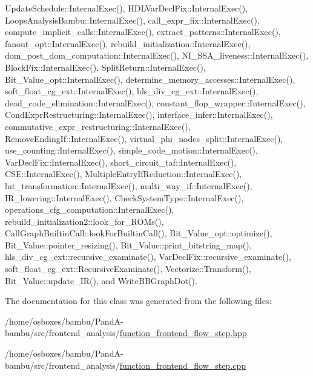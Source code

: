 Update\+Schedule\+::\+Internal\+Exec(), H\+D\+L\+Var\+Decl\+Fix\+::\+Internal\+Exec(), Loops\+Analysis\+Bambu\+::\+Internal\+Exec(), call\+\_\+expr\+\_\+fix\+::\+Internal\+Exec(), compute\+\_\+implicit\+\_\+calls\+::\+Internal\+Exec(), extract\+\_\+patterns\+::\+Internal\+Exec(), fanout\+\_\+opt\+::\+Internal\+Exec(), rebuild\+\_\+initialization\+::\+Internal\+Exec(), dom\+\_\+post\+\_\+dom\+\_\+computation\+::\+Internal\+Exec(), N\+I\+\_\+\+S\+S\+A\+\_\+liveness\+::\+Internal\+Exec(), Block\+Fix\+::\+Internal\+Exec(), Split\+Return\+::\+Internal\+Exec(), Bit\+\_\+\+Value\+\_\+opt\+::\+Internal\+Exec(), determine\+\_\+memory\+\_\+accesses\+::\+Internal\+Exec(), soft\+\_\+float\+\_\+cg\+\_\+ext\+::\+Internal\+Exec(), hls\+\_\+div\+\_\+cg\+\_\+ext\+::\+Internal\+Exec(), dead\+\_\+code\+\_\+elimination\+::\+Internal\+Exec(), constant\+\_\+flop\+\_\+wrapper\+::\+Internal\+Exec(), Cond\+Expr\+Restructuring\+::\+Internal\+Exec(), interface\+\_\+infer\+::\+Internal\+Exec(), commutative\+\_\+expr\+\_\+restructuring\+::\+Internal\+Exec(), Remove\+Ending\+If\+::\+Internal\+Exec(), virtual\+\_\+phi\+\_\+nodes\+\_\+split\+::\+Internal\+Exec(), use\+\_\+counting\+::\+Internal\+Exec(), simple\+\_\+code\+\_\+motion\+::\+Internal\+Exec(), Var\+Decl\+Fix\+::\+Internal\+Exec(), short\+\_\+circuit\+\_\+taf\+::\+Internal\+Exec(), C\+S\+E\+::\+Internal\+Exec(), Multiple\+Entry\+If\+Reduction\+::\+Internal\+Exec(), lut\+\_\+transformation\+::\+Internal\+Exec(), multi\+\_\+way\+\_\+if\+::\+Internal\+Exec(), I\+R\+\_\+lowering\+::\+Internal\+Exec(), Check\+System\+Type\+::\+Internal\+Exec(), operations\+\_\+cfg\+\_\+computation\+::\+Internal\+Exec(), rebuild\+\_\+initialization2\+::look\+\_\+for\+\_\+\+R\+O\+Ms(), Call\+Graph\+Builtin\+Call\+::look\+For\+Builtin\+Call(), Bit\+\_\+\+Value\+\_\+opt\+::optimize(), Bit\+\_\+\+Value\+::pointer\+\_\+resizing(), Bit\+\_\+\+Value\+::print\+\_\+bitstring\+\_\+map(), hls\+\_\+div\+\_\+cg\+\_\+ext\+::recursive\+\_\+examinate(), Var\+Decl\+Fix\+::recursive\+\_\+examinate(), soft\+\_\+float\+\_\+cg\+\_\+ext\+::\+Recursive\+Examinate(), Vectorize\+::\+Transform(), Bit\+\_\+\+Value\+::update\+\_\+\+I\+R(), and Write\+B\+B\+Graph\+Dot().



The documentation for this class was generated from the following files\+:\begin{DoxyCompactItemize}
\item 
/home/osboxes/bambu/\+Pand\+A-\/bambu/src/frontend\+\_\+analysis/\hyperlink{function__frontend__flow__step_8hpp}{function\+\_\+frontend\+\_\+flow\+\_\+step.\+hpp}\item 
/home/osboxes/bambu/\+Pand\+A-\/bambu/src/frontend\+\_\+analysis/\hyperlink{function__frontend__flow__step_8cpp}{function\+\_\+frontend\+\_\+flow\+\_\+step.\+cpp}\end{DoxyCompactItemize}
